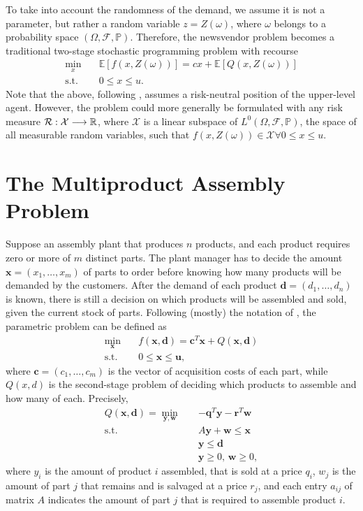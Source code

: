 \documentclass[twoside,11pt]{article}
\begin{document}
To take into account the randomness of the demand, we assume it is not a parameter, but rather a random variable $z=Z(\omega)$, where $\omega$ belongs to a probability space $(\Omega,\mathcal{F},\mathbb{P})$.
Therefore, the newsvendor problem becomes a traditional two-stage stochastic programming problem with recourse
\begin{align*}
    \min_{x} \quad & \mathbb{E}\left[ f(x,Z(\omega)) \right] = cx + \mathbb{E}\left[ Q(x,Z(\omega)) \right]  \\
    \textrm{s.t.} \quad & 0\le x\le u
.\end{align*}
Note that the above, following \citet{birgeIntroductionStochasticProgramming2011}, assumes a risk-neutral position of the upper-level agent.
However, the problem could more generally be formulated with any risk measure $\mathcal{R}: \mathcal{X} \longrightarrow \mathbb{R}$, where $\mathcal{X}$ is a linear subspace of $L^{0}(\Omega, \mathcal{F},\mathbb{P})$, the space of all measurable random variables, such that $f(x,Z(\omega)) \in \mathcal{X} \forall 0\le x\le u$.


\section*{The Multiproduct Assembly Problem}

Suppose an assembly plant that produces $n$ products, and each product requires zero or more of $m$ distinct parts.
The plant manager has to decide the amount $\bm{x}=(x_1,\ldots,x_{m})$ of parts to order before knowing how many products will be demanded by the customers.
After the demand of each product $\bm{d}=(d_1,\ldots,d_n)$ is known, there is still a decision on which products will be assembled and sold, given the current stock of parts.
Following (mostly) the notation of \citet{shapiroLecturesStochasticProgramming2009}, the parametric problem can be defined as
\begin{align*}
    \min_{\bm{x}} \quad & f(\bm{x},\bm{d}) = \bm{c}^{T} \bm{x} + Q(\bm{x}, \bm{d}) \\
    \textrm{s.t.} \quad & 0 \le \bm{x} \le \bm{u}
,\end{align*}
where $\bm{c}=(c_1,\ldots,c_m)$ is the vector of acquisition costs of each part, while $Q(x,d)$ is the second-stage problem of deciding which products to assemble and how many of each.
Precisely,
\begin{align*}
    Q(\bm{x},\bm{d}) = \min_{\bm{y},\bm{w}} \quad & -\bm{q}^{T} \bm{y} - \bm{r}^{T}\bm{w} \\
    \textrm{s.t.} \quad & A\bm{y} + \bm{w} \le \bm{x} \\
      & \bm{y} \le \bm{d} \\
      & \bm{y} \ge 0,\, \bm{w} \ge 0
,\end{align*}
where $y_i$ is the amount of product $i$ assembled, that is sold at a price $q_i$, $w_j$ is the amount of part $j$ that remains and is salvaged at a price $r_j$, and each entry $a_{ij}$ of matrix $A$ indicates the amount of part $j$ that is required to assemble product $i$.
\end{document}
